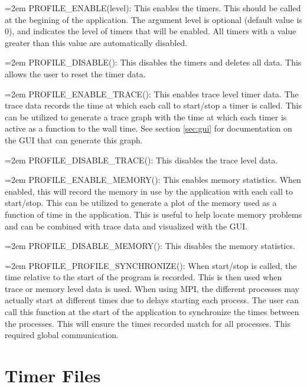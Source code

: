 \documentclass[fleqn,10pt,letterpaper]{article}
\begin{document}
\hangindent=2em\noindent
PROFILE\_ENABLE(level):  This enables the timers.  This should be called at the begining of
    the application.  The argument level is optional (default value is 0), and indicates the
    level of timers that will be enabled.  All timers with a value greater than this value
    are automatically disabled.

\hangindent=2em\noindent
PROFILE\_DISABLE():  This disables the timers and deletes all data.  This allows the user to 
    reset the timer data.

\hangindent=2em\noindent
PROFILE\_ENABLE\_TRACE():  This enables trace level timer data.  The trace data records the
    time at which each call to start/stop a timer is called.  This can be utilized to generate
    a trace graph with the time at which each timer is active as a function to the wall time.
    See section \ref{sec:gui} for documentation on the GUI that can generate this graph.  

\hangindent=2em\noindent
PROFILE\_DISABLE\_TRACE():  This disables the trace level data.

\hangindent=2em\noindent
PROFILE\_ENABLE\_MEMORY():  This enables memory statistics.  When enabled, this will record 
    the memory in use by the application with each call to start/stop.  This can be utilized
    to generate a plot of the memory used as a function of time in the application.  This is
    useful to help locate memory problems and can be combined with trace data and visualized with
    the GUI.  

\hangindent=2em\noindent
PROFILE\_DISABLE\_MEMORY():  This disables the memory statistics.  

\hangindent=2em\noindent
PROFILE\_PROFILE\_SYNCHRONIZE():  When start/stop is called, the time relative to the start
    of the program is recorded.  This is then used when trace or memory level data is used.
    When using MPI, the different processes may actually start at different times due to 
    delays starting each process.  The user can call this function at the start of the 
    application to synchronize the times between the processes.  This will ensure the times 
    recorded match for all processes.  This required global communication.



\section{Timer Files}  \label{sec:analysis}
\end{document}
